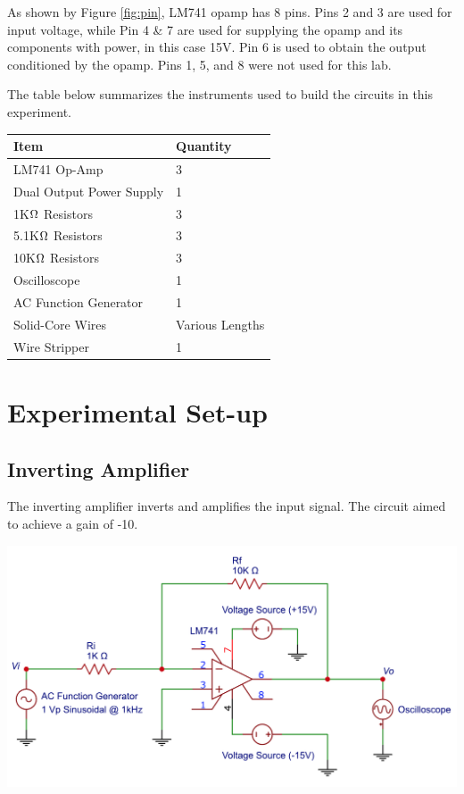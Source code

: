 \documentclass[journal]{IEEEtran}
\begin{document}
\noindent As shown by Figure \ref{fig:pin}, LM741 opamp has 8 pins. Pins 2 and 3 are used for input voltage, while Pin 4 \& 7 are used for supplying the opamp and its components with power, in this case 15V. Pin 6 is used to obtain the output conditioned by the opamp. Pins 1, 5, and 8 were not used for this lab. 

\noindent The table below summarizes the instruments used to build the circuits in this experiment.

\begingroup
    \medskip
\centering
\def\arraystretch{1.5}
\begin{tabular}{ll}
\toprule
Item & Quantity \\
\midrule
LM741 Op-Amp & 3 \\
Dual Output Power Supply & 1 \\
1K$\ohm$ Resistors & 3 \\
5.1K$\ohm$ Resistors & 3 \\
10K$\ohm$ Resistors & 3 \\
Oscilloscope & 1 \\
AC Function Generator & 1 \\
Solid-Core Wires & Various Lengths \\
Wire Stripper & 1 \\
\bottomrule
\end{tabular}
\label{fig:table}
    \medskip
\endgroup

\section{Experimental Set-up}

\subsection{Inverting Amplifier}
\noindent The inverting amplifier inverts and amplifies the input signal. The circuit aimed to achieve a gain of -10.

\begingroup
    \centering
    \medskip
    \includegraphics[width=\columnwidth]{images/lab7_inverting.png}
    \label{fig:inv_diagram}
    \medskip
\endgroup
\end{document}
